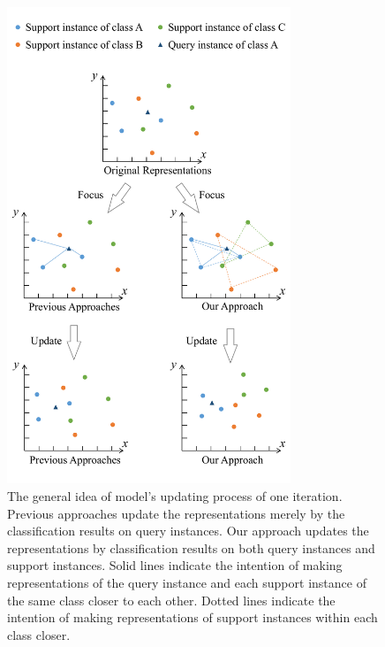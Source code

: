\begin{figure}[tbh!]
	\centering
	\includegraphics[width=8.5cm]{support.pdf}
	\caption{The general idea of model's updating process of one iteration. Previous approaches update the representations merely by the classification results on query instances. Our approach updates the representations by classification results on both query instances and support instances.
	Solid lines indicate the intention of making representations of the query instance and each support instance of the same class closer to each other.
	Dotted lines indicate the intention of making representations of support instances within each class closer.
	}
	\label{fig:support}
\end{figure}



